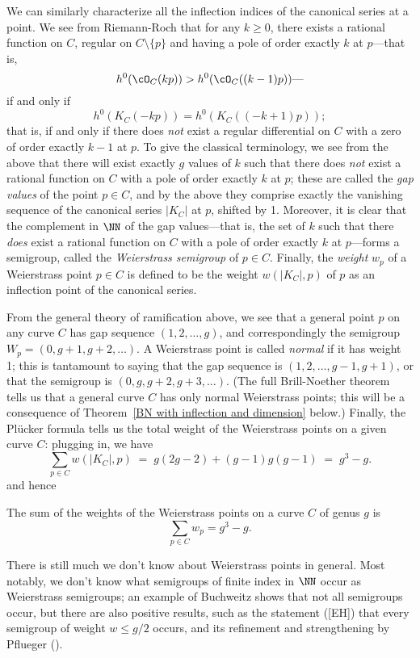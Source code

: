 We can similarly characterize all the inflection indices of the canonical series at a point. We see from Riemann-Roch that for any $k \geq 0$, there exists a rational function on $C$, regular on $C \setminus \{p\}$ and having a pole of order exactly $k$ at $p$---that is,
$$
h^0(\cO_C(kp)) > h^0(\cO_C((k-1)p))\text{---}
$$
if and only if 
$$
h^0(K_C(-kp)) = h^0(K_C((-k+1)p)); 
$$
that is, if and only if there does \emph{not} exist a regular differential on $C$ with a zero of order exactly $k-1$ at $p$. To give the classical terminology, we see from the above that there will exist exactly $g$ values of $k$ such that there does \emph{not} exist a rational function on $C$ with a pole of order exactly $k$ at $p$; these are called the \emph{gap values} of the point $p \in C$, and by the above they comprise exactly the vanishing sequence of the canonical series $|K_C|$ at $p$, shifted by 1. Moreover, it is clear that the complement in $\NN$ of the gap values---that is, the set of $k$ such that there \emph{does} exist a rational function on $C$ with a pole of order exactly $k$ at $p$---forms a semigroup, called the \emph{Weierstrass semigroup} of $p \in C$. Finally, the \emph{weight} $w_p$ of a Weierstrass point $p \in C$  is defined to be the weight $w(|K_C|,p)$ of $p$ as an inflection point of the canonical series.

From the general theory of ramification above, we see that a general point $p$ on any curve $C$ has gap sequence $(1,2,\dots,g)$, and correspondingly the semigroup $W_p = (0, g+1, g+2, \dots)$. A Weierstrass point is called \emph{normal} if it has weight 1; this is tantamount to saying that the gap sequence is $(1,2,\dots,g-1,g+1)$, or that the semigroup is $(0, g, g+2, g+3, \dots)$. (The full Brill-Noether theorem tells us that a general curve $C$ has only normal Weierstrass points; this will be a consequence of Theorem~\ref{BN with inflection and dimension} below.) Finally, the Pl\"ucker formula tells us  the total weight of the Weierstrass points on a given curve $C$: plugging in, we have
$$
\sum_{p \in C} w(|K_C|, p) \; = \; g(2g-2) + (g-1)g(g-1) \; =\;  g^3-g.
$$ 
and hence

\begin{theorem}\label{plucker formula}
The sum of the weights of the Weierstrass points on a curve $C$ of genus $g$ is
$$
\sum_{p \in C} w_p = g^3-g.
$$
\end{theorem}

There is still much we don't know about Weierstrass points in general. Most notably, we don't know what semigroups of finite index in $\NN$ occur as Weierstrass semigroups; an example of Buchweitz shows that not all semigroups occur, but there are also positive results, such as the statement ([EH]) that every semigroup of weight $w \leq g/2$ occurs, and its refinement and strengthening by Pflueger (\cite{**}).


